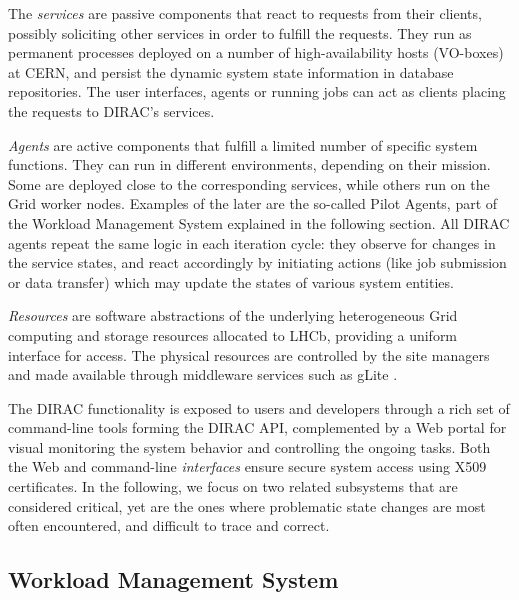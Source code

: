 \documentclass[10pt,conference]{IEEEtran}
\begin{document}
The \textit{services} are passive components that react to requests from their clients,
possibly soliciting other services in order to fulfill the requests. They run as
permanent processes deployed on a number of high-availability hosts (VO-boxes)
at CERN, and persist the dynamic system state information in database
repositories. The user interfaces, agents or running jobs can act as clients
placing the requests to DIRAC’s services.

\textit{Agents} are active components that fulfill a limited number of specific system
functions. They can run in different environments, depending on their mission.
Some are deployed close to the corresponding services, while others run on the
Grid worker nodes.  Examples of the later are the so-called Pilot Agents, part
of the Workload Management System explained in the following section. All DIRAC
agents repeat the same logic in each iteration cycle: they observe for changes
in the service states, and react accordingly by initiating actions (like job
submission or data transfer) which may update the states of various system
entities.

\textit{Resources} are software abstractions of the underlying heterogeneous Grid
computing and storage resources allocated to LHCb, providing a uniform interface
for access. The physical resources are controlled by the site managers and made
available through middleware services such as gLite \cite{gLite}.

The DIRAC functionality is exposed to users and developers through a rich set of
command-line tools forming the DIRAC API, complemented by a Web portal for
visual monitoring the system behavior and controlling the ongoing tasks. Both
the Web and command-line \textit{interfaces} ensure secure system access using X509
certificates. In the following, we focus on two related subsystems that are considered critical, yet 
are the ones where problematic state changes are most often encountered, 
and difficult to trace and correct.  

\subsection{Workload Management System}
\end{document}
